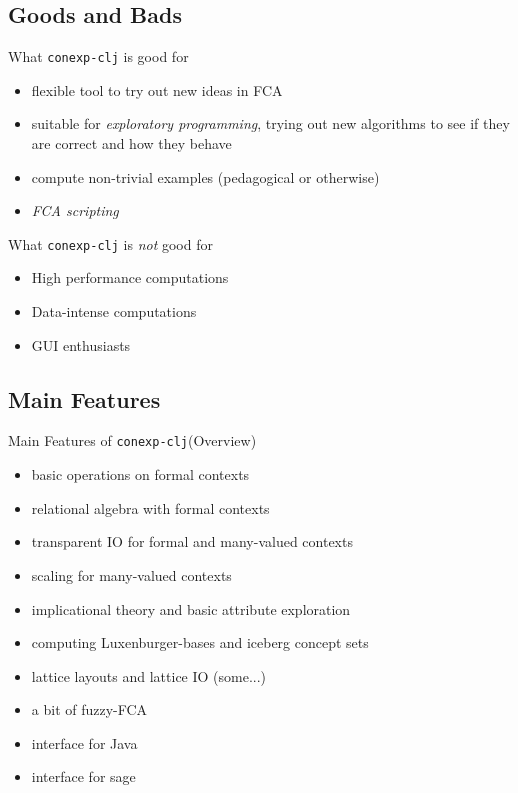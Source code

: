 \documentclass{beamer}
\newcommand{\cclj}{\texttt{conexp-clj}\xspace}
\begin{document}
\subsection{Goods and Bads}

\begin{frame}

  \onslide<+->

  \begin{block}{What \cclj is good for}
    \begin{itemize}
    \item<+-> flexible tool to try out new ideas in FCA
    \item<+-> suitable for \emph{exploratory programming}, \ie trying out new algorithms
      to see if they are correct and how they behave
    \item<+-> compute non-trivial examples (pedagogical or otherwise)
    \item<+-> \emph{FCA scripting}
    \end{itemize}
  \end{block}

  \onslide<+->

  \begin{block}{What \cclj is \emph{not} good for}
    \begin{itemize}
    \item<+-> High performance computations
    \item<+-> Data-intense computations
    \item<+-> GUI enthusiasts
    \end{itemize}
  \end{block}
\end{frame}

\subsection{Main Features}

\begin{frame}

  \onslide<+->
  
  \begin{block}{Main Features of \cclj (Overview)}
    \begin{itemize}
    \item basic operations on formal contexts
    \item relational algebra with formal contexts
    \item transparent IO for formal and many-valued contexts
    \item scaling for many-valued contexts
    \item implicational theory and basic attribute exploration
    \item computing Luxenburger-bases and iceberg concept sets
    \item lattice layouts and lattice IO (some...)
    \item a bit of fuzzy-FCA
    \item interface for Java
    \item interface for sage
    \end{itemize}
  \end{block}
\end{frame}
\end{document}
